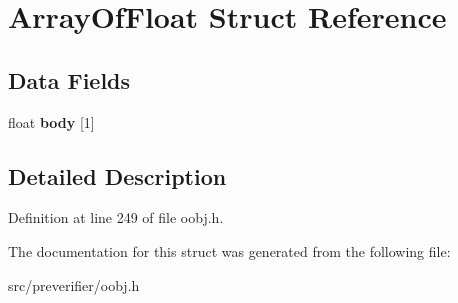 \section{ArrayOfFloat Struct Reference}
\label{struct_array_of_float}
\subsection*{Data Fields}
\begin{DoxyCompactItemize}
\item 
float {\bfseries body} [1]\label{struct_array_of_float_a1f810ac3da94f1c4ab6e9eb9888c2d48}

\end{DoxyCompactItemize}


\subsection{Detailed Description}


Definition at line 249 of file oobj.h.



The documentation for this struct was generated from the following file:\begin{DoxyCompactItemize}
\item 
src/preverifier/oobj.h\end{DoxyCompactItemize}
